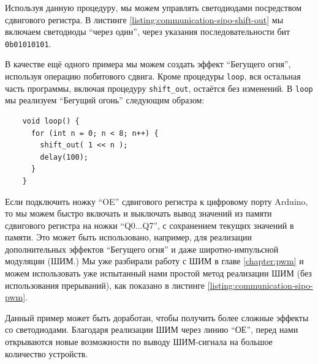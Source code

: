 \documentclass[../sparc.tex]{subfiles}
\begin{document}
Используя данную процедуру, мы можем управлять светодиодами посредством
сдвигового регистра.  В листинге \ref{listing:communication-sipo-shift-out} мы
включаем светодиоды ``через один'', через указания последовательности бит
\texttt{0b01010101}.

В качестве ещё одного примера мы можем создать эффект ``Бегущего огня'',
используя операцию побитового сдвига.  Кроме процедуры \texttt{loop},
вся остальная часть программы, включая процедуру \texttt{shift_out},
остаётся без изменений.  В \texttt{loop} мы реализуем ``Бегущий огонь''
следующим образом:

\begin{listing}[H]
  \begin{verbatim}
    void loop() {
      for (int n = 0; n < 8; n++) {
        shift_out( 1 << n );
        delay(100);
      }
    }
  \end{verbatim}
  \label{listing:communication-sipo-chasing-lights}
  \caption{Реализация эффекта ``Бегущего огня'' на сдвиговом регистре.}
\end{listing}

Если подключить ножку ``OE'' сдвигового регистра к цифровому порту Arduino, то
мы можем быстро включать и выключать вывод значений из памяти сдвигового
регистра на ножки ``Q0...Q7'', с сохранением текущих значений в памяти.  Это
может быть использовано, например, для реализации дополнительных эффектов
``Бегущего огня'' и даже широтно-импульсной модуляции (ШИМ.)  Мы уже разбирали
работу с ШИМ в главе \ref{chapter:pwm} и можем использовать уже испытанный нами
простой метод реализации ШИМ (без использования прерываний), как показано в
листинге \ref{listing:communication-sipo-pwm}.

Данный пример может быть доработан, чтобы получить более сложные эффекты со
светодиодами.  Благодаря реализации ШИМ через линию ``ОЕ'', перед нами
открываются новые возможности по выводу ШИМ-сигнала на большое количество
устройств.
\end{document}
